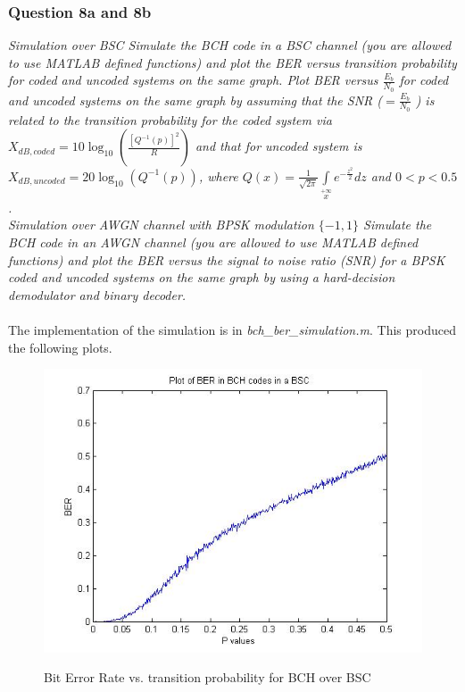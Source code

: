 \documentclass[a4paper]{article}
\begin{document}
\subsubsection{Question 8a and 8b} \textit{Simulation over BSC Simulate the BCH code in a BSC channel (you are allowed to use MATLAB defined functions) and plot the BER versus transition probability for coded and uncoded systems on the same graph. Plot BER versus $\frac{E_b}{N_0}$ for coded and uncoded systems on the same graph by assuming that the SNR ($ = \frac{E_b}{N_0}$ ) is related to the transition probability for the coded system via $X_{dB,coded} = 10 \log_{10}(\frac{[Q^{- 1} (p)]^2}{R}) $ and that for uncoded system is $X_{dB,uncoded} = 20\log_{10}(Q^{- 1} (p)) $, where $Q(x) = \frac{1}{\sqrt{2 \pi}} \int\limits_{x}\limits^{+\infty} e^{ -\frac{z^2}{2}} dz $ and $0 < p < 0.5$.}\\
\textit{Simulation over AWGN channel with BPSK modulation $\{-1, 1\}$ Simulate the BCH code in an AWGN channel (you are allowed to use MATLAB defined functions) and plot the BER versus the signal to noise ratio (SNR) for a BPSK coded and uncoded systems on the same graph by using a hard-decision demodulator and binary decoder.}\\
\\
The implementation of the simulation is in \textit{bch\_ber\_simulation.m}.
This produced the following plots. \\
\begin{figure}[H]
\centering
\includegraphics[scale=0.5]{plotBER_BSC_pvals.jpg} \\
\caption{Bit Error Rate vs. transition probability for BCH over BSC}
\end{figure}
\end{document}
